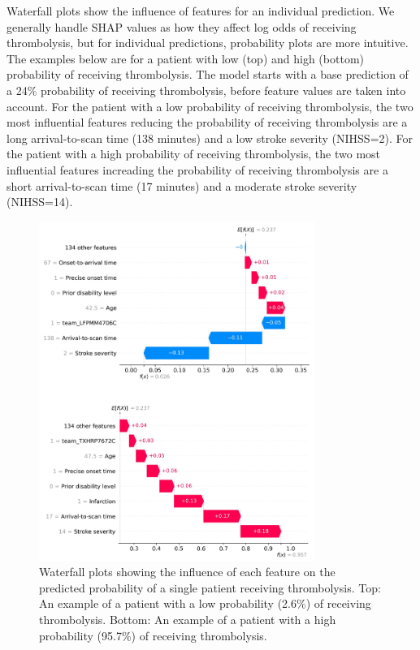 Waterfall plots show the influence of features for an individual prediction. We generally handle SHAP values as how they affect log odds of receiving thrombolysis, but for individual predictions, probability plots are more intuitive. The examples below are for a patient with low (top) and high (bottom) probability of receiving thrombolysis. The model starts with a base prediction of a 24\% probability of receiving thrombolysis, before feature values are taken into account. For the patient with a low probability of receiving thrombolysis, the two most influential features reducing the probability of receiving thrombolysis are a long arrival-to-scan time (138 minutes) and a low stroke severity (NIHSS=2). For the patient with a high probability of receiving thrombolysis, the two most influential features increading the probability of receiving thrombolysis are a short arrival-to-scan time (17 minutes) and a moderate stroke severity (NIHSS=14). 

\begin{figure}
\centering
\includegraphics[width=0.8\textwidth]{./images/waterfall}
\caption{Waterfall plots showing the influence of each feature on the predicted probability of a single patient receiving thrombolysis. Top: An example of a patient with a low probability (2.6\%) of receiving thrombolysis. Bottom: An example of a patient with a high probability (95.7\%) of receiving thrombolysis.}
\label{fig:waterfall}
\end{figure}




